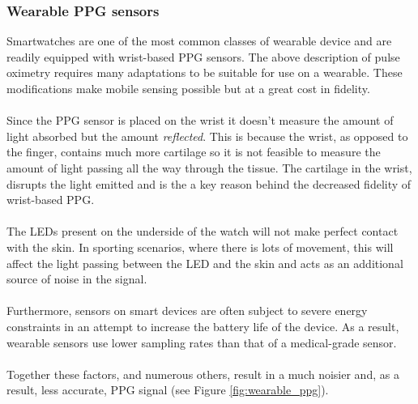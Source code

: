 \subsubsection{Wearable PPG sensors}
Smartwatches are one of the most common classes of wearable device and are readily equipped with wrist-based PPG sensors.
The above description of pulse oximetry requires many adaptations to be suitable for use on a wearable. 
These modifications make mobile sensing possible but at a great cost in fidelity.
\\\\
Since the PPG sensor is placed on the wrist it doesn't measure the amount of light absorbed but the amount \textit{reflected}. This is because the wrist, as opposed to the finger, contains much more cartilage
so it is not feasible to measure the amount of light passing all the way through the tissue.
The cartilage in the wrist, disrupts the light emitted and is the a key reason behind the decreased fidelity of wrist-based PPG.
\\\\
The LEDs present on the underside of the watch will not make perfect contact with the skin. In sporting scenarios, where there is lots of movement, this will affect the light passing between the LED and the skin and acts as an additional source of noise in the signal.
\\\\
Furthermore, sensors on smart devices are often subject to severe energy constraints in an attempt to increase the battery life of the device.
As a result, wearable sensors use lower sampling rates than that of a medical-grade sensor.
\\\\
Together these factors, and numerous others, result in a much noisier and, as a result, less accurate, PPG signal (see Figure \ref{fig:wearable_ppg}).

